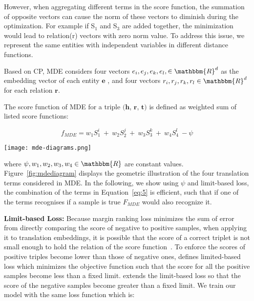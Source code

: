 \documentclass{ecai}
\begin{document}
However, when aggregating different terms in the score function, the summation of opposite vectors can cause the norm of these vectors to diminish during the optimization. For example if S$_1$ and S$_3$ are added together, the minimization would lead to relation(r) vectors with zero norm value.
To address this issue, we represent the same entities with independent variables in different distance functions. 



Based on CP, MDE considers four vectors $e_i, e_j, e_k, e_l,  \in \mathbbm{R}^d$ as the embedding vector of each entity $\textbf{e}$
, and four vectors $r_i, r_j, r_k, r_l \in \mathbbm{R}^d$ for each relation $\textbf{r}$. 

The score function of MDE for a triple $(\textbf{h}$, $ \textbf{r}$, $\textbf{t})$ is defined as weighted sum of listed score functions:



\begin{equation}\label{eq:5}
f_{MDE} = w_1 S_1^i~+~ w_2 S_2^j~+~ w_3 S_3^k~+~w_4S_4^l~ - \psi 
\end{equation}

\begin{figure*}[t]
\centering
\texttt{[image: mde-diagrams.png]}
\caption{Geometric illustration of the translation terms considered in MDE.}
\label{fig:mdediagram}
\end{figure*}

where $\psi, w_1, w_2, w_3, w_4 \in \mathbbm{R}$ are constant values. Figure~\ref{fig:mdediagram} displays the geometric illustration of the four translation terms considered in MDE. In the following, we show using $\psi$ and limit-based loss, the combination of the terms in Equation~\eqref{eq:5} is efficient, such that if one of the terms recognises if a sample is true $F_{MDE}$ would also recognize it.

\textbf{Limit-based Loss:}
Because margin ranking loss minimizes the sum of error from directly comparing the score of negative to positive samples, when applying it to translation embeddings, it is possible that the score of a correct triplet is not small enough to hold the relation of the score function~\cite{zhou2017learning}. To enforce the scores of positive triples become lower than those of negative ones, \cite{zhou2017learning} defines limited-based loss which minimizes the objective function such that the score for all the positive samples become less than a fixed limit. \cite{sun2018bootstrapping} extends the limit-based loss so that the score of the negative samples become greater than a fixed limit. We train our model with the same loss function which is:
\end{document}
